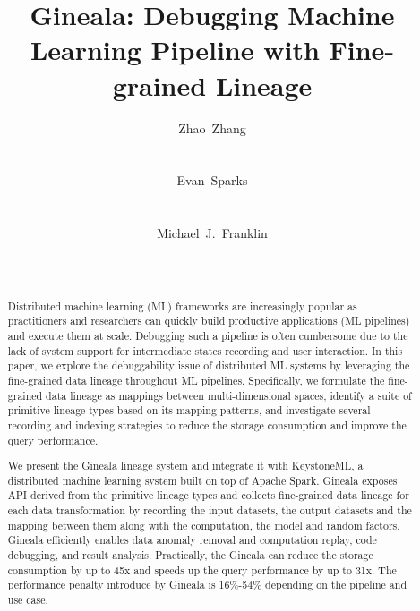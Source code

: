\documentclass{sig-alternate}
\begin{document}
\title{Gineala: Debugging Machine Learning Pipeline with Fine-grained Lineage}

\author{
\alignauthor Zhao~Zhang\\\
       \\
        \\
\alignauthor Evan~Sparks\\\
       \\
       \\
\alignauthor Michael~J.~Franklin\\
       \\
       \\
}

\maketitle

\begin{abstract}
Distributed machine learning (ML) frameworks are increasingly popular as practitioners and researchers 
can quickly build productive applications (ML pipelines) and execute them at scale. 
Debugging such a pipeline is often cumbersome due to the lack of system support for
intermediate states recording and user interaction.
In this paper, we explore the debuggability issue of distributed ML systems by leveraging the fine-grained 
data lineage throughout ML pipelines. 
Specifically, we formulate the fine-grained data lineage as mappings between multi-dimensional spaces,
identify a suite of primitive lineage types based on its mapping patterns, 
and investigate several recording and indexing strategies to reduce the storage consumption and improve the query performance.

We present the Gineala lineage system and integrate it with KeystoneML, a distributed machine learning
system built on top of Apache Spark. 
Gineala exposes API derived from the primitive lineage types and collects fine-grained data lineage for each 
data transformation by recording the input datasets, the output datasets and the mapping between them along
with the computation, the model and random factors.
Gineala efficiently enables data anomaly removal and computation replay, code debugging, and result analysis.
Practically, the Gineala can reduce the storage consumption by up to 45x and speeds up the query performance
by up to 31x. The performance penalty introduce by Gineala is 16\%-54\% depending on the pipeline and
use case.

\end{abstract}
\end{document}
